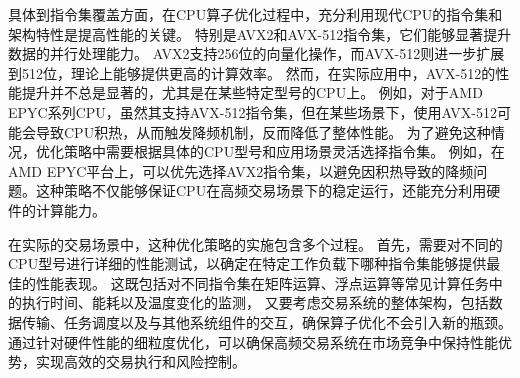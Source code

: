 具体到指令集覆盖方面，在CPU算子优化过程中，充分利用现代CPU的指令集和架构特性是提高性能的关键。
特别是AVX2和AVX-512指令集，它们能够显著提升数据的并行处理能力。
AVX2支持256位的向量化操作，而AVX-512则进一步扩展到512位，理论上能够提供更高的计算效率。
然而，在实际应用中，AVX-512的性能提升并不总是显著的，尤其是在某些特定型号的CPU上。
例如，对于AMD EPYC系列CPU，虽然其支持AVX-512指令集，但在某些场景下，使用AVX-512可能会导致CPU积热，从而触发降频机制，反而降低了整体性能。
为了避免这种情况，优化策略中需要根据具体的CPU型号和应用场景灵活选择指令集。
例如，在AMD EPYC平台上，可以优先选择AVX2指令集，以避免因积热导致的降频问题。这种策略不仅能够保证CPU在高频交易场景下的稳定运行，还能充分利用硬件的计算能力。

在实际的交易场景中，这种优化策略的实施包含多个过程。
首先，需要对不同的CPU型号进行详细的性能测试，以确定在特定工作负载下哪种指令集能够提供最佳的性能表现。
这既包括对不同指令集在矩阵运算、浮点运算等常见计算任务中的执行时间、能耗以及温度变化的监测，
又要考虑交易系统的整体架构，包括数据传输、任务调度以及与其他系统组件的交互，确保算子优化不会引入新的瓶颈。
通过针对硬件性能的细粒度优化，可以确保高频交易系统在市场竞争中保持性能优势，实现高效的交易执行和风险控制。
